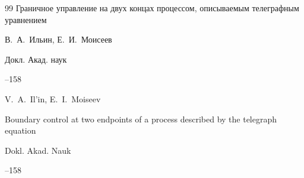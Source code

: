 \begin{thebibliography}{99}
\paper Граничное управление на двух концах процессом, описываемым телеграфным уравнением

\by В.~А.~Ильин, Е.~И.~Моисеев

\jour Докл. Акад. наук




--158

\misctransl

\by V.~A.~Il'in, E.~I.~Moiseev

\paper Boundary control at two endpoints of a process described by the telegraph equation

\jour  Dokl. Akad. Nauk 




–158







\end{thebibliography}





\noindent

\hskip6.5cm \thedate \par\noindent

\hskip6.5cm\therevdate

%




%




\makeengtitlem







 \newpage

%


%

%

